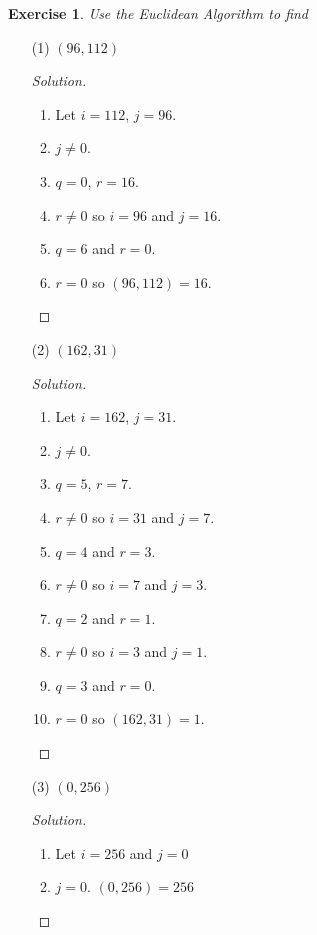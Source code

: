 \documentclass[12pt,leqno]{article}
\numberwithin{equation}{section}
\newtheorem{exer}[thm]{Exercise}
\theoremstyle{definition}
\begin{document}
\begin{exer}
Use the Euclidean Algorithm to find \end{exer}
\begin{enumerate}
    \item[(1)] $(96, 112)$
    \begin{proof}[Solution]$ $\\
    \begin{enumerate}[1.]
    \item
    Let $i = 112$, $j = 96$.
    \item
    $j \neq 0$.
    \item
    $q = 0$, $r = 16$.
    \item
    $r \neq 0$ so $i = 96$ and $j = 16$.
    \item
    $q = 6$ and $r = 0$.
    \item
    $r = 0$ so $(96, 112) = 16$.
    \end{enumerate}
    \end{proof}

\pagebreak
    \item[(2)] $(162, 31)$
    \begin{proof}[Solution]$ $\\
    \begin{enumerate}[1.]
    \item
    Let $i = 162$, $j = 31$.
    \item
    $j \neq 0$.
    \item
    $q = 5$, $r = 7$.
    \item
    $r \neq 0$ so $i = 31$ and $j = 7$.
    \item
    $q = 4$ and $r = 3$.
    \item
    $r \neq 0$ so $i = 7$ and $j = 3$.
    \item
    $q = 2$ and $r = 1$.
    \item
    $r \neq 0$ so $i = 3$ and $j = 1$.
    \item
    $q = 3$ and $r = 0$.
    \item
    $r = 0$ so $(162, 31) = 1$.
    \end{enumerate}
    \end{proof}

    \item[(3)] $(0,256)$
    \begin{proof}[Solution]$ $\\
    \begin{enumerate}[1.]
    \item
    Let $i = 256$ and $j = 0$
    \item
    $j = 0$.  $(0, 256) = 256$
    \end{enumerate}
    \end{proof}


\end{enumerate}
\end{document}
